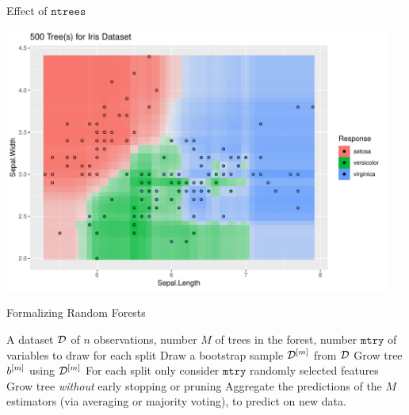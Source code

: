 \documentclass[11pt,compress,t,notes=noshow, xcolor=table]{beamer}
\begin{document}
\begin{vbframe}{Effect of $\texttt{ntrees}$}
\begin{knitrout}
{\centering \includegraphics[width=0.95\textwidth]{figure/cart_forest_intro_3} 

}
\end{knitrout}
\end{vbframe}

\begin{vbframe}{Formalizing Random Forests}
  \begin{algorithm}[H]
  \caption*{Random Forest algorithm}
  \begin{algorithmic}[1]
  A dataset $\mathcal{D}$ of $n$ observations, number $M$ of trees
  in the forest, number $\texttt{mtry}$ of variables to draw for each split
  \State Draw a bootstrap sample $\mathcal{D}^{[m]}$ from $\mathcal{D}$
  \State Grow tree $b^{[m]}$ using $\mathcal{D}^{[m]}$
  \State For each split only consider $\texttt{mtry}$ randomly selected features
  \State Grow tree \textit{without} early stopping or pruning
\EndFor
\State Aggregate the predictions of the $M$ estimators (via averaging or majority voting), to predict on new data.
\end{algorithmic}
\end{algorithm}
\end{vbframe}

\endlecture
\end{document}
